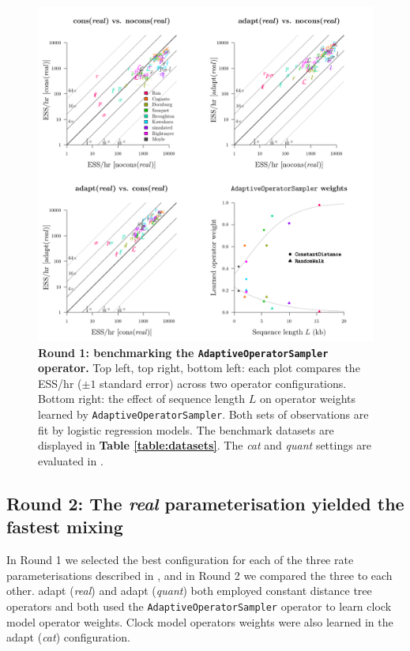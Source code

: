 \documentclass[10pt,letterpaper]{article}
\begin{document}
\begin{figure}[!h]
\includegraphics[width=\textwidth]{benchmarking/benchmarkingVM/ESS_round1_real.pdf}
\caption{\textbf{Round 1: benchmarking the \texttt{AdaptiveOperatorSampler} operator.} Top left, top right, bottom left: each plot compares the ESS/hr ($\pm 1$ standard error) across two operator configurations.
Bottom right: the effect of sequence length $L$ on operator weights learned by \texttt{AdaptiveOperatorSampler}. Both sets of observations are fit by logistic regression models.
 The benchmark datasets are displayed in \textbf{Table \ref{table:datasets}}. The \emph{cat} and \emph{quant} settings are evaluated in \textbf{}.  }
\label{fig:round1Results}
\end{figure}








\clearpage
\subsection*{Round 2: The \textit{real} parameterisation yielded the fastest mixing }


In Round 1 we selected the best configuration for each of the three rate parameterisations described in \textbf{},  and in Round 2 we compared the three to each other.
adapt (\textit{real}) and adapt (\textit{quant}) both employed constant distance tree operators \cite{zhang2020improving} and both used the \texttt{AdaptiveOperatorSampler} operator to learn clock model operator weights.
Clock model operators weights were also learned in the adapt (\textit{cat}) configuration.
\end{document}
